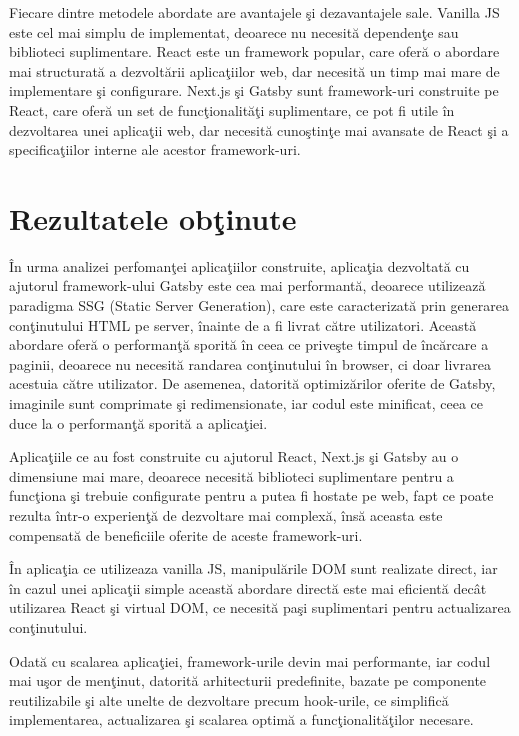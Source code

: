 \documentclass[12pt, a4paper]{report}
\begin{document}
Fiecare dintre metodele abordate are avantajele \c si dezavantajele sale. Vanilla JS este cel mai simplu de implementat, deoarece nu necesit\u a dependen\c te sau biblioteci suplimentare. React este un framework popular, care ofer\u a o abordare mai structurat\u a a dezvolt\u arii aplica\c tiilor web, dar necesit\u a un timp mai mare de implementare \c si configurare. Next.js \c si Gatsby sunt framework-uri construite pe React, care ofer\u a un set de func\c tionalit\u a\c ti suplimentare, ce pot fi utile \^ in dezvoltarea unei aplica\c tii web, dar necesit\u a cuno\c stin\c te mai avansate de React \c si a specifica\c tiilor interne ale acestor framework-uri.

\section{Rezultatele ob\c tinute}

\^In urma analizei perfoman\c tei aplica\c tiilor construite, aplica\c tia dezvoltat\u a cu ajutorul framework-ului Gatsby este cea mai performant\u a, deoarece utilizeaz\u a paradigma SSG (Static Server Generation), care este caracterizat\u a prin generarea con\c tinutului HTML pe server, \^inainte de a fi livrat c\u atre utilizatori. Aceast\u a abordare ofer\u a o performan\c t\u a sporit\u a \^in ceea ce prive\c ste timpul de \^inc\u arcare a paginii, deoarece nu necesit\u a randarea con\c tinutului \^in browser, ci doar livrarea acestuia c\u atre utilizator. De asemenea, datorit\u a optimiz\u arilor oferite de Gatsby, imaginile sunt comprimate \c si redimensionate, iar codul este minificat, ceea ce duce la o performan\c t\u a sporit\u a a aplica\c tiei.

Aplica\c tiile ce au fost construite cu ajutorul React, Next.js \c si Gatsby au o dimensiune mai mare, deoarece necesit\u a biblioteci suplimentare pentru a func\c tiona \c si trebuie configurate pentru a putea fi hostate pe web, fapt ce poate rezulta \^intr-o experien\c t\u a de dezvoltare mai complex\u a, \^ins\u a aceasta este compensat\u a de beneficiile oferite de aceste framework-uri.

\^In aplica\c tia ce utilizeaza vanilla JS, manipul\u arile DOM sunt realizate direct, iar \^in cazul unei aplica\c tii simple aceast\u a abordare direct\u a este mai eficient\u a dec\^at utilizarea React \c si virtual DOM, ce necesit\u a pa\c si suplimentari pentru actualizarea con\c tinutului.

Odat\u a cu scalarea aplica\c tiei, framework-urile devin mai performante, iar codul mai u\c sor de men\c tinut, datorit\u a arhitecturii predefinite, bazate pe componente reutilizabile \c si alte unelte de dezvoltare precum hook-urile, ce simplific\u a implementarea, actualizarea \c si scalarea optim\u a a func\c tionalit\u a\c tilor necesare.
\end{document}
